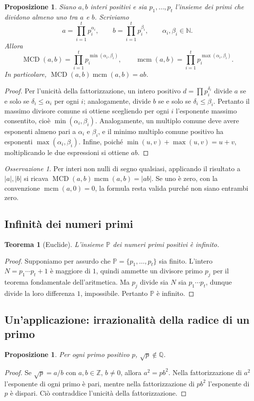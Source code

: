 \documentclass[11pt,a4paper]{article}
\newcommand{\N}{\mathbb{N}}
\newcommand{\Z}{\mathbb{Z}}
\newcommand{\Q}{\mathbb{Q}}
\newcommand{\Prim}{\mathbb{P}}
\theoremstyle{definition}
\theoremstyle{plain}
\newtheorem{proposizione}[definizione]{Proposizione}
\newtheorem{teorema}[definizione]{Teorema}
\theoremstyle{remark}
\newtheorem*{osservazione}{Osservazione}
\begin{document}
\begin{proposizione}
Siano $a,b$ interi positivi e sia $p_1,\dots,p_t$ l'insieme dei primi che dividono almeno uno tra $a$ e $b$. Scriviamo
\[
a=\prod_{i=1}^{t}p_i^{\alpha_i},\qquad b=\prod_{i=1}^{t}p_i^{\beta_i},\qquad \alpha_i,\beta_i\in\N.
\]
Allora
\[
\operatorname{MCD}(a,b)=\prod_{i=1}^{t}p_i^{\min(\alpha_i,\beta_i)},\qquad
\operatorname{mcm}(a,b)=\prod_{i=1}^{t}p_i^{\max(\alpha_i,\beta_i)}.
\]
In particolare, $\operatorname{MCD}(a,b)\operatorname{mcm}(a,b)=ab$.
\end{proposizione}
\begin{proof}
Per l'unicità della fattorizzazione, un intero positivo $d=\prod p_i^{\delta_i}$ divide $a$ se e solo se $\delta_i\le\alpha_i$ per ogni $i$; analogamente, divide $b$ se e solo se $\delta_i\le\beta_i$. Pertanto il massimo divisore comune si ottiene scegliendo per ogni $i$ l'esponente massimo consentito, cioè $\min(\alpha_i,\beta_i)$. Analogamente, un multiplo comune deve avere esponenti almeno pari a $\alpha_i$ e $\beta_i$, e il minimo multiplo comune positivo ha esponenti $\max(\alpha_i,\beta_i)$. Infine, poiché $\min(u,v)+\max(u,v)=u+v$, moltiplicando le due espressioni si ottiene $ab$.
\end{proof}
\begin{osservazione}
Per interi non nulli di segno qualsiasi, applicando il risultato a $|a|,|b|$ si ricava $\operatorname{MCD}(a,b)\operatorname{mcm}(a,b)=|ab|$. Se uno è zero, con la convenzione $\operatorname{mcm}(a,0)=0$, la formula resta valida purché non siano entrambi zero.
\end{osservazione}

\subsection{Infinità dei numeri primi}
\begin{teorema}[Euclide]
L'insieme $\Prim$ dei numeri primi positivi è infinito.
\end{teorema}
\begin{proof}
Supponiamo per assurdo che $\Prim=\{p_1,\ldots,p_t\}$ sia finito. L'intero $N=p_1\cdots p_t+1$ è maggiore di $1$, quindi ammette un divisore primo $p_j$ per il teorema fondamentale dell'aritmetica. Ma $p_j$ divide sia $N$ sia $p_1\cdots p_t$, dunque divide la loro differenza $1$, impossibile. Pertanto $\Prim$ è infinito.
\end{proof}

\subsection{Un'applicazione: irrazionalità della radice di un primo}
\begin{proposizione}
Per ogni primo positivo $p$, $\sqrt p\notin\Q$.
\end{proposizione}
\begin{proof}
Se $\sqrt p=a/b$ con $a,b\in\Z$, $b\ne0$, allora $a^2=pb^2$. Nella fattorizzazione di $a^2$ l'esponente di ogni primo è pari, mentre nella fattorizzazione di $pb^2$ l'esponente di $p$ è dispari. Ciò contraddice l'unicità della fattorizzazione.
\end{proof}
\end{document}
